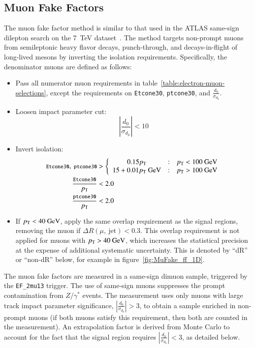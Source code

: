 \subsection{Muon Fake Factors}\label{sec:muon-fake-factors}
The muon fake factor method is similar to that used in the ATLAS same-sign dilepton search on the \SI{7}{\tera\electronvolt} dataset~\cite{TheATLASCollaboration:2012df}. The method targets non-prompt muons from semileptonic heavy flavor decays, punch-through, and decays-in-flight of long-lived mesons by inverting the isolation requirements. Specifically, the denominator muons are defined as follows:
\begin{itemize}
  \item Pass all numerator muon requirements in table~\ref{table:electron-muon-selections}, except the requirements on \verb.Etcone30., \verb.ptcone30., and $\frac{d_0}{\sigma_{d_0}}$. 
  \item Loosen impact parameter cut:
  \begin{equation}
	|\frac{d_0}{\sigma_{d_0}}|<10
  \end{equation}
  \item Invert isolation:
  \begin{align}
	{\footnotesize \texttt{Etcone30}},\ {\footnotesize \texttt{ptcone30}} &> \left\{\begin{array}{ccc} 0.15 p_{\text{T}} & : & p_{\text{T}}<100~\mbox{GeV} \\ 15+0.01 p_{\text{T}}~\mbox{GeV} & : & p_{\text{T}}>100~\mbox{GeV} \end{array} \right. \\
	{\footnotesize \frac{\texttt{Etcone30}}{p_{\text{T}}}} &< 2.0 \\
	{\footnotesize \frac{\texttt{ptcone30}}{p_{\text{T}}}} &< 2.0 \\
  \end{align}
  \item If $p_{\text{T}}<40~\mbox{GeV}$, apply the same overlap requirement as the signal regions, removing the muon if $\Delta R (\mu,\ \mbox{jet})<0.3$. This overlap requirement is not applied for muons with $p_{\text{T}}>40~\mbox{GeV}$, which increases the statistical precision at the expense of additional systematic uncertainty. This is denoted by ``dR'' or ``non-dR'' below, for example in figure~\ref{fig:MuFake_ff_1D}.
\end{itemize}

The muon fake factors are measured in a same-sign dimuon sample, triggered by the \verb.EF_2mu13. trigger. The use of same-sign muons suppresses the prompt contamination from $Z/\gamma^{*}$ events. The measurement uses only muons with large track impact parameter significance, $|\frac{d_0}{\sigma_{d_0}}|>3$, to obtain a sample enriched in non-prompt muons (if both muons satisfy this requirement, then both are counted in the measurement). An extrapolation factor is derived from Monte Carlo to account for the fact that the signal region requires $|\frac{d_0}{\sigma_{d_0}}|<3$, as detailed below.

